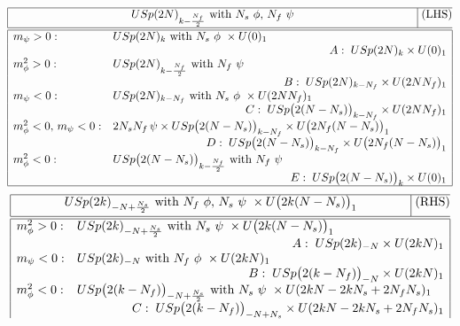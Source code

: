 \documentclass[a4paper, 12pt]{article}
\numberwithin{equation}{section}
\begin{document}
\begin{table}[t!]
{\renewcommand{\arraystretch}{1.43}
$$
\begin{array}{|lll|}
\hline
\multicolumn{3}{|c|}{USp(2N)_{k - \frac{N_f}2} \text{ with $N_s$ $\phi$, $N_f$ $\psi$}} \text{ (LHS)}\\[.5em]
\hline\hline
m_\psi>0: &	USp(2N)_k \text{ with $N_s$ $\phi$ } \times U(0)_1 & \qquad\qquad \\
	& \multicolumn{2}{r|}{A:\; USp(2N)_k \times U(0)_1} \\
m_\phi^2>0: &	USp(2N)_{k-\frac{N_f}2} \text{ with $N_f$ $\psi$} & \\
	& \multicolumn{2}{r|}{B:\; USp(2N)_{k-N_f} \times U(2NN_f)_1} \\
m_\psi<0: &	USp(2N)_{k-N_f} \text{ with $N_s$ $\phi$ } \times U(2NN_f)_1 & \\
	& \multicolumn{2}{r|}{C:\; USp\big(2(N-N_s)\big)_{k-N_f} \times U(2NN_f)_1} \\
m_\phi^2<0,\, m_\psi<0: & 2 N_s N_f \, \psi \times USp\big(2(N-N_s)\big)_{k-N_f} \times U\big(2N_f (N-N_s) \big)_1 & \\
	& \multicolumn{2}{r|}{D:\; USp\big(2(N-N_s)\big)_{k-N_f} \times U\big( 2N_f(N-N_s) \big)_1} \\
m_\phi^2<0: &	USp\big(2(N-N_s)\big)_{k - \frac{N_f}2} \text{ with $N_f$ $\psi$} & \\
	& \multicolumn{2}{r|}{E:\; USp\big(2(N-N_s)\big)_k \times U(0)_1} \\
\hline
\end{array}
$$
$$
\begin{array}{|lll|}
\hline
\multicolumn{3}{|c|}{USp(2k)_{-N + \frac{N_s}2} \text{ with $N_f$ $\phi$, $N_s$ $\psi$ } \times U\big( 2k(N-N_s) \big)_1} \text{ (RHS)}\\[.5em]
\hline\hline
m_\phi^2>0: &	USp(2k)_{-N + \frac{N_s}2} \text{ with $N_s$ $\psi$ } \times U\big( 2k(N-N_s) \big)_1 & \\
	& \multicolumn{2}{r|}{A:\; USp(2k)_{-N} \times U(2kN)_1} \\
m_\psi<0: &	USp(2k)_{-N} \text{ with $N_f$ $\phi$ } \times U(2kN)_1 & \\
	& \multicolumn{2}{r|}{B:\; USp\big(2(k-N_f)\big)_{-N} \times U(2kN)_1} \\
m_\phi^2<0: &	USp\big(2(k-N_f)\big)_{-N + \frac{N_s}2} \text{ with $N_s$ $\psi$ } \times U(2kN - 2kN_s + 2N_fN_s)_1 & \\
	& \multicolumn{2}{r|}{C:\; USp\big(2(k-N_f)\big)_{-N + N_s} \times U(2kN - 2kN_s + 2N_fN_s)_1} \\

\end{array}$$}
\end{table}
\end{document}
